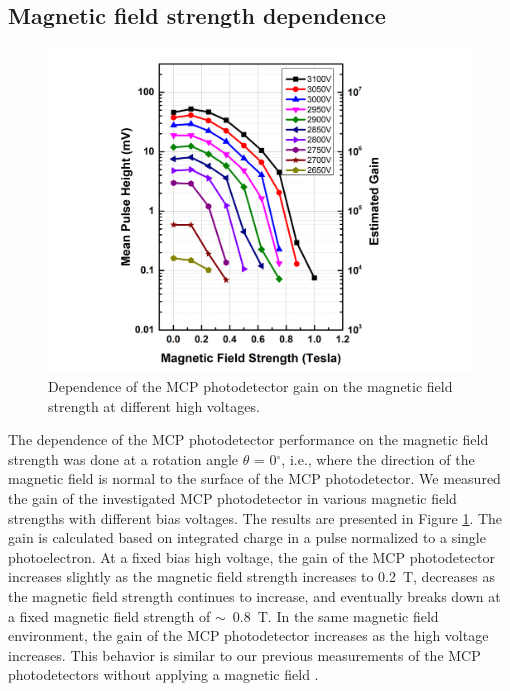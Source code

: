 \documentclass[preprint,5p]{elsarticle}
\begin{document}
\subsection{Magnetic field strength dependence}\label{subsec_HV}
\begin{figure}[tbp]
\hspace{-1.0 cm} 
\includegraphics[scale=0.1]{fig/MCPs_gain_B_HV.png}
\caption{Dependence of the MCP photodetector gain on the magnetic field 
strength at different high voltages.} \label{fig:MCPs_gain_B_HV}
\end{figure}

The dependence of the MCP photodetector performance on the magnetic field 
strength was done at a rotation angle $\theta$ = 0$^{\circ}$, i.e., where the 
direction of the magnetic field is normal to the surface of the MCP 
photodetector. We measured the gain of the investigated MCP photodetector in 
various magnetic field strengths with different bias voltages. The results are 
presented in Figure \ref{fig:MCPs_gain_B_HV}. The gain is calculated based on 
integrated charge in a pulse normalized to a single photoelectron. At a fixed 
bias high voltage, the gain of the MCP photodetector increases slightly as the 
magnetic field strength increases to 0.2~T, decreases as the magnetic field 
strength continues to increase, and eventually breaks down at a fixed magnetic 
field strength of $\sim$~0.8~T. In the same magnetic field environment, the 
gain of the MCP photodetector increases as the high voltage increases. This 
behavior is similar to our previous measurements of the MCP photodetectors 
without applying a magnetic field \cite{Wang-MCPs}. 
\end{document}
